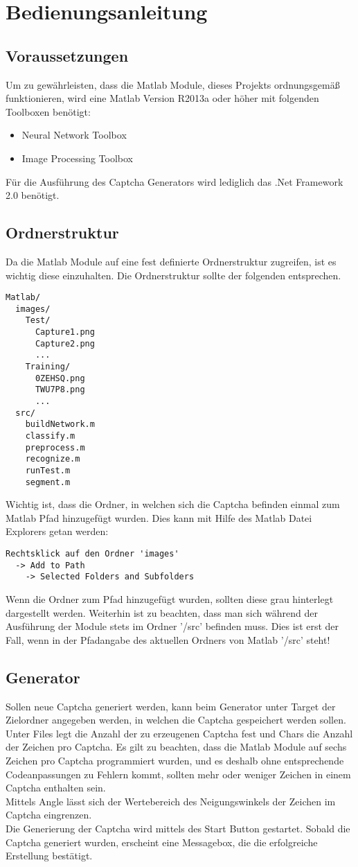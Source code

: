 \section{Bedienungsanleitung}
\subsection{Voraussetzungen}
Um zu gewährleisten, dass die Matlab Module, dieses Projekts ordnungsgemäß funktionieren, wird eine Matlab Version R2013a oder höher mit folgenden Toolboxen benötigt:
\begin{itemize}
\item Neural Network Toolbox
\item Image Processing Toolbox
\end{itemize}
Für die Ausführung des Captcha Generators wird lediglich das .Net Framework 2.0 benötigt.

\subsection{Ordnerstruktur}
Da die Matlab Module auf eine fest definierte Ordnerstruktur zugreifen, ist es wichtig diese einzuhalten. Die Ordnerstruktur sollte der folgenden entsprechen.
\begin{verbatim}
Matlab/
  images/
    Test/
      Capture1.png
      Capture2.png
      ...
    Training/
      0ZEHSQ.png
      TWU7P8.png
      ...
  src/
    buildNetwork.m
    classify.m
    preprocess.m
    recognize.m
    runTest.m
    segment.m
\end{verbatim}
Wichtig ist, dass die Ordner, in welchen sich die Captcha befinden einmal zum Matlab Pfad hinzugefügt wurden. Dies kann mit Hilfe des Matlab Datei Explorers getan werden:
\begin{verbatim}
Rechtsklick auf den Ordner 'images'
  -> Add to Path
    -> Selected Folders and Subfolders
\end{verbatim}
Wenn die Ordner zum Pfad hinzugefügt wurden, sollten diese grau hinterlegt dargestellt werden. Weiterhin ist zu beachten, dass man sich während der Ausführung der Module stets im Ordner '/src' befinden muss. Dies ist erst der Fall, wenn in der Pfadangabe des aktuellen Ordners von Matlab '/src' steht!
\subsection{Generator}
Sollen neue Captcha generiert werden, kann beim Generator unter Target der Zielordner angegeben werden, in welchen die Captcha gespeichert werden sollen. Unter Files legt die Anzahl der zu erzeugenen Captcha fest und Chars die Anzahl der Zeichen pro Captcha. Es gilt zu beachten, dass die Matlab Module auf sechs Zeichen pro Captcha programmiert wurden, und es deshalb ohne entsprechende Codeanpassungen zu Fehlern kommt, sollten mehr oder weniger Zeichen in einem Captcha enthalten sein.\\
Mittels Angle lässt sich der Wertebereich des Neigungswinkels der Zeichen im Captcha eingrenzen.\\
Die Generierung der Captcha wird mittels des Start Button gestartet. Sobald die Captcha generiert wurden, erscheint eine Messagebox, die die erfolgreiche Erstellung bestätigt.


